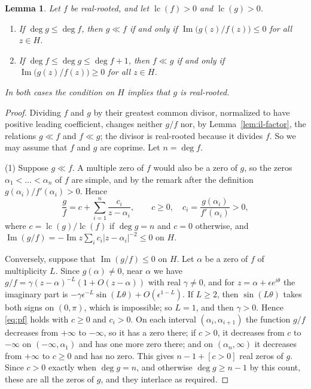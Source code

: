 \documentclass[11pt]{amsart}
\newtheorem{lemma}[theorem]{Lemma}
\theoremstyle{definition}
\DeclareMathOperator{\lc}{lc}
\begin{document}
\begin{lemma}\label{lem:il-pick}
Let $f$ be real-rooted, and let $\lc(f)>0$ and $\lc(g)>0$.
\begin{enumerate}
\item If $\deg g\le\deg f$, then $g\ll f$ if and only if $\operatorname{Im}\bigl(g(z)/f(z)\bigr)\le0$ for all $z\in H$.
\item If $\deg f\le\deg g\le\deg f+1$, then $f\ll g$ if and only if $\operatorname{Im}\bigl(g(z)/f(z)\bigr)\ge0$ for all $z\in H$.
\end{enumerate}
In both cases the condition on $H$ implies that $g$ is real-rooted.
\end{lemma}

\begin{proof}
Dividing $f$ and $g$ by their greatest common divisor, normalized to have positive leading coefficient, changes neither $g/f$ nor, by Lemma~\ref{lem:il-factor}, the relations $g\ll f$ and $f\ll g$; the divisor is real-rooted because it divides $f$. So we may assume that $f$ and $g$ are coprime. Let $n=\deg f$.

(1) Suppose $g\ll f$. A multiple zero of $f$ would also be a zero of $g$, so the zeros $\alpha_1<\dots<\alpha_n$ of $f$ are simple, and by the remark after the definition $g(\alpha_i)/f'(\alpha_i)>0$. Hence
\begin{equation}\label{eq:pf}
  \frac gf=c+\sum_{i=1}^{n}\frac{c_i}{z-\alpha_i},\qquad c\ge0,\quad c_i=\frac{g(\alpha_i)}{f'(\alpha_i)}>0,
\end{equation}
where $c=\lc(g)/\lc(f)$ if $\deg g=n$ and $c=0$ otherwise, and $\operatorname{Im}(g/f)=-\operatorname{Im}z\sum_ic_i|z-\alpha_i|^{-2}\le0$ on $H$.

Conversely, suppose that $\operatorname{Im}(g/f)\le0$ on $H$. Let $\alpha$ be a zero of $f$ of multiplicity $L$. Since $g(\alpha)\ne0$, near $\alpha$ we have $g/f=\gamma(z-\alpha)^{-L}(1+O(z-\alpha))$ with real $\gamma\ne0$, and for $z=\alpha+\epsilon e^{i\theta}$ the imaginary part is $-\gamma\epsilon^{-L}\sin(L\theta)+O(\epsilon^{1-L})$. If $L\ge2$, then $\sin(L\theta)$ takes both signs on $(0,\pi)$, which is impossible; so $L=1$, and then $\gamma>0$. Hence \eqref{eq:pf} holds with $c\ge0$ and $c_i>0$. On each interval $(\alpha_i,\alpha_{i+1})$ the function $g/f$ decreases from $+\infty$ to $-\infty$, so it has a zero there; if $c>0$, it decreases from $c$ to $-\infty$ on $(-\infty,\alpha_1)$ and has one more zero there; and on $(\alpha_n,\infty)$ it decreases from $+\infty$ to $c\ge0$ and has no zero. This gives $n-1+[c>0]$ real zeros of $g$. Since $c>0$ exactly when $\deg g=n$, and otherwise $\deg g\ge n-1$ by this count, these are all the zeros of $g$, and they interlace as required.


\end{proof}
\end{document}
